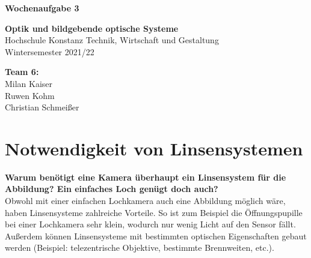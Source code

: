 \documentclass[a4paper]{article}
\begin{document}
	\thispagestyle{empty}
	
	\begin{center}\strut
		\bfseries\Huge
		Wochenaufgabe 3
	\end{center}
	\vfill
	
	\begin{center}\strut
		\textbf{Optik und bildgebende optische Systeme}\\
		Hochschule Konstanz Technik, Wirtschaft und Gestaltung\\
		Wintersemester 2021/22
	\end{center}
	
	\begin{center}\strut
		\textbf{Team 6:}\\
		Milan Kaiser\\
		Ruwen Kohm\\
		Christian Schmeißer\\
	\end{center}
	\vfill
	\vfill

	\clearpage
	
	\section{Notwendigkeit von Linsensystemen}
	\textbf{Warum benötigt eine Kamera überhaupt ein Linsensystem für die Abbildung? Ein einfaches
		Loch genügt doch auch?}\\
	Obwohl mit einer einfachen Lochkamera auch eine Abbildung möglich wäre, haben Linsensysteme zahlreiche Vorteile. So ist zum Beispiel die Öffnungspupille bei einer Lochkamera sehr klein, wodurch nur wenig Licht auf den Sensor fällt. Außerdem können Linsensysteme mit bestimmten optischen Eigenschaften gebaut werden (Beispiel: telezentrische Objektive, bestimmte Brennweiten, etc.).\\
	
\end{document}
